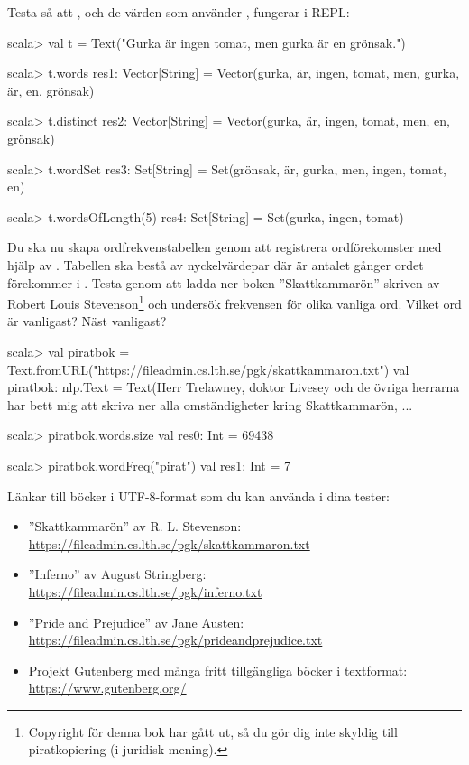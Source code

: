 \noindent Testa så att , och de värden som använder , fungerar i REPL:
\begin{REPL}
scala> val t = Text("Gurka är ingen tomat, men gurka är en grönsak.")

scala> t.words
res1: Vector[String] =
  Vector(gurka, är, ingen, tomat, men, gurka, är, en, grönsak)

scala> t.distinct
res2: Vector[String] =
  Vector(gurka, är, ingen, tomat, men, en, grönsak)

scala> t.wordSet
res3: Set[String] = Set(grönsak, är, gurka, men, ingen, tomat, en)

scala> t.wordsOfLength(5)
res4: Set[String] = Set(gurka, ingen, tomat)

\end{REPL}



\Task Du ska nu skapa ordfrekvenstabellen  genom att registrera ordförekomster med hjälp av . Tabellen  ska bestå av nyckelvärdepar  där  är antalet gånger ordet  förekommer i . Testa  genom att ladda ner boken ''Skattkammarön'' skriven av Robert Louis Stevenson\footnote{Copyright för denna bok har gått ut, så du gör dig inte skyldig till piratkopiering (i juridisk mening).} och undersök frekvensen för olika vanliga ord. Vilket ord är vanligast? Näst vanligast?

\begin{REPL}[basicstyle=\color{white}\ttfamily\fontsize{9}{11}\selectfont]
scala> val piratbok = Text.fromURL("https://fileadmin.cs.lth.se/pgk/skattkammaron.txt")
val piratbok: nlp.Text = Text(Herr Trelawney, doktor Livesey och de övriga herrarna har bett mig att skriva ner alla omständigheter kring Skattkammarön, ...

scala> piratbok.words.size
val res0: Int = 69438

scala> piratbok.wordFreq("pirat")
val res1: Int = 7
\end{REPL}
Länkar till böcker i UTF-8-format som du kan använda i dina tester:
\begin{itemize}%
\item ''Skattkammarön'' av R. L. Stevenson: \\\url{https://fileadmin.cs.lth.se/pgk/skattkammaron.txt}
\item ''Inferno'' av August Stringberg: \\\url{https://fileadmin.cs.lth.se/pgk/inferno.txt}
\item ''Pride and Prejudice'' av Jane Austen: \\\url{https://fileadmin.cs.lth.se/pgk/prideandprejudice.txt}
\item Projekt Gutenberg med många fritt tillgängliga böcker i textformat: \\\url{https://www.gutenberg.org/}
\end{itemize}







